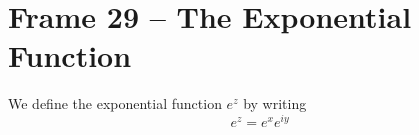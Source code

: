 \documentclass{article}
\begin{document}
\section{Frame 29 -- The Exponential Function}
We define the exponential function $e^z$ by writing
\[
	e^z = e^x e^{iy}
\]
\end{document}
